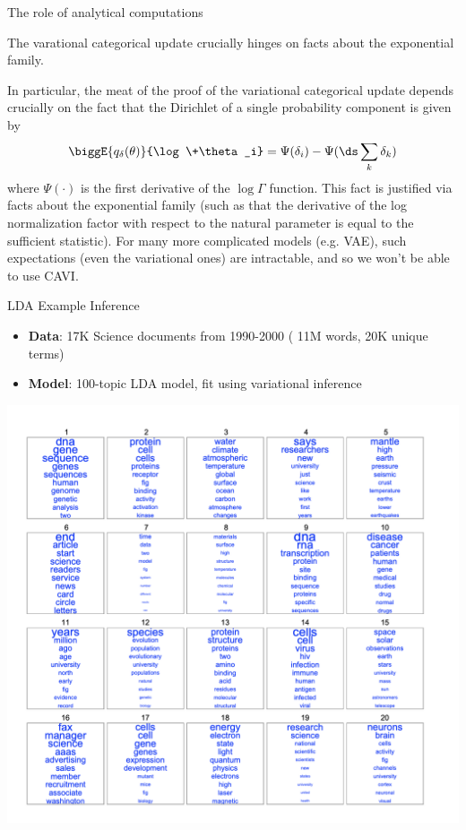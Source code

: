 \documentclass[10pt]{beamer}
\begin{document}
\begin{frame}{The role of analytical computations}

The varational categorical update crucially hinges on facts about the \alert{exponential family}.   \pause

In particular, the meat of the proof of the variational categorical update depends crucially on the fact that the Dirichlet of a single probability component is given by
\begin{equation} \label{dirichlet_expect_prob_component}
 \biggE{q_\delta(\theta)}{\log \+\theta_i} =    \Psi(\delta_{i}) - \Psi (\ds\sum_k \delta_k) 
\end{equation}
where $\Psi(\cdot)$ is the first derivative of the $\log \Gamma$ function.  \tiny This fact is justified via facts about the exponential family (such as that the derivative of the log normalization factor with respect to the natural parameter is equal to the sufficient statistic). \normalsize
\vfill
\pause 
For many more complicated models (e.g. VAE), such expectations  \tiny (even the variational ones) \normalsize are intractable, and so we won't be able to use CAVI.
\end{frame}

\begin{frame}{LDA Example Inference}

\scriptsize
\begin{itemize}
\item \textbf{Data}: 17K Science documents from 1990-2000 ( 11M words, 20K unique terms)
\item \textbf{Model}: 100-topic LDA model, fit using variational inference
\end{itemize}

\begin{center}
\includegraphics[width=.75\textwidth]{images/lda_example_inference}
\end{center}


\end{frame}
\end{document}
